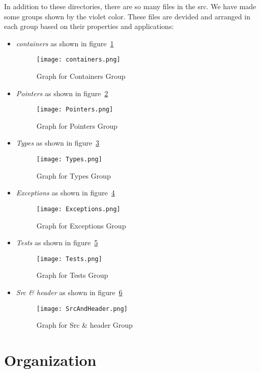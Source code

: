 \documentclass[11pt,fleqn]{book} %
\begin{document}
\begin{itemize}
In addition to these directories, there are so many files in the src. We have made some groups shown by the violet color. These files are devided and arranged in each group based on their properties and applications:
\begin{itemize}
 \item \emph{containers} as shown in figure~\ref{fig:containers}
\begin{figure}
  \texttt{[image: containers.png]}
  \caption{Graph for Containers Group}
  \label{fig:containers}
\end{figure}
 \item \emph{Pointers} as shown in figure~\ref{fig:Pointers}
\begin{figure}
  \texttt{[image: Pointers.png]}
  \caption{Graph for Pointers Group}
  \label{fig:Pointers}
\end{figure}
 \item \emph{Types} as shown in figure~\ref{fig:Types}
\begin{figure}
  \texttt{[image: Types.png]}
  \caption{Graph for Types Group}
  \label{fig:Types}
\end{figure}
 \item \emph{Exceptions} as shown in figure~\ref{fig:Exceptions}
\begin{figure}
  \texttt{[image: Exceptions.png]}
  \caption{Graph for Exceptions Group}
  \label{fig:Exceptions}
\end{figure}
 \item \emph{Tests} as shown in figure~\ref{fig:Tests}
\begin{figure}
  \texttt{[image: Tests.png]}
  \caption{Graph for Tests Group}
  \label{fig:Tests}
\end{figure}
 \item \emph{Src \& header} as shown in figure~\ref{fig:SrcAndHeader}
\begin{figure}
  \texttt{[image: SrcAndHeader.png]}
  \caption{Graph for Src \& header Group}
  \label{fig:SrcAndHeader}
\end{figure}
 \end{itemize}
\end{itemize}







\chapter{Organization}
\label{chap:Organization}
\end{document}
